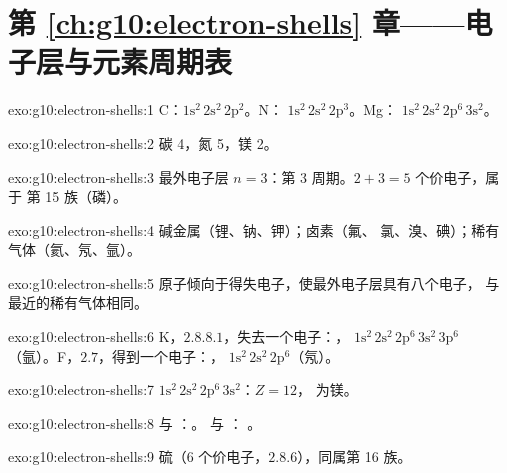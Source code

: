 \section*{第 \ref{ch:g10:electron-shells} 章——电子层与元素周期表}

\begin{solution}{exo:g10:electron-shells:1}
C：$1\mathrm{s}^2\,2\mathrm{s}^2\,2\mathrm{p}^2$。N：
$1\mathrm{s}^2\,2\mathrm{s}^2\,2\mathrm{p}^3$。Mg：
$1\mathrm{s}^2\,2\mathrm{s}^2\,2\mathrm{p}^6\,3\mathrm{s}^2$。
\end{solution}

\begin{solution}{exo:g10:electron-shells:2}
碳 4，氮 5，镁 2。
\end{solution}

\begin{solution}{exo:g10:electron-shells:3}
最外电子层 $n = 3$：第 3 周期。$2 + 3 = 5$ 个价电子，属于
第 15 族（磷）。
\end{solution}

\begin{solution}{exo:g10:electron-shells:4}
碱金属（锂、钠、钾）；卤素（氟、
氯、溴、碘）；稀有气体（氦、氖、氩）。
\end{solution}

\begin{solution}{exo:g10:electron-shells:5}
原子倾向于得失电子，使最外电子层具有八个电子，
与最近的稀有气体相同。
\end{solution}

\begin{solution}{exo:g10:electron-shells:6}
K，$2.8.8.1$，失去一个电子：，
$1\mathrm{s}^2\,2\mathrm{s}^2\,2\mathrm{p}^6\,3\mathrm{s}^2\,3\mathrm{p}^6$
（氩）。F，$2.7$，得到一个电子：，
$1\mathrm{s}^2\,2\mathrm{s}^2\,2\mathrm{p}^6$（氖）。
\end{solution}

\begin{solution}{exo:g10:electron-shells:7}
$1\mathrm{s}^2\,2\mathrm{s}^2\,2\mathrm{p}^6\,3\mathrm{s}^2$：$Z = 12$，
为镁。
\end{solution}

\begin{solution}{exo:g10:electron-shells:8}
 与 ：。 与 ：
。
\end{solution}

\begin{solution}{exo:g10:electron-shells:9}
硫（6 个价电子，$2.8.6$），同属第 16 族。
\end{solution}

